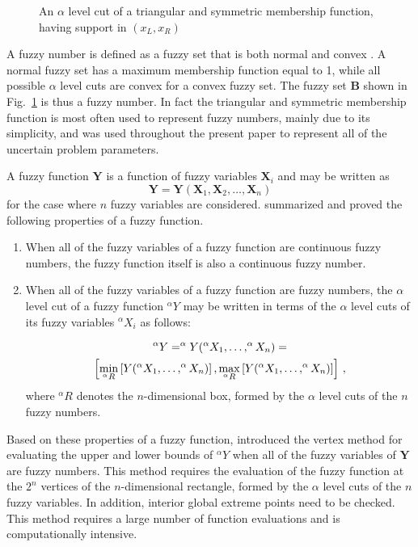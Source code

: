 \documentclass[stropt]{svjour}
\def\b{\mathbf{B}}%
\def\y{\mathbf{Y}}%
\def\x{\mathbf{X}}%
\begin{document}
\begin{figure}
\vspace{5cm}
\caption{An $\alpha$ level cut of a triangular and symmetric membership
function, having support in $(x_L, x_R)$}
\label{fig:1}
\end{figure}

A fuzzy number is defined as a fuzzy set that is both normal and convex
\citep[pp.~97]{Klir95}.
A normal fuzzy set has a maximum membership function equal to 1, while all
possible $\alpha$ level cuts are convex for a convex fuzzy set.
The fuzzy set $\b$
shown in Fig.~\ref{fig:1} is thus a fuzzy number.
In fact the triangular and symmetric membership function is most often used to
represent fuzzy numbers, mainly due to its simplicity, and was used throughout
the present paper to represent all of the uncertain problem parameters.

A fuzzy function $\y$ is a function of fuzzy variables $\x_i$ and may be
written as
\begin{equation}
\y=\y (\x_1,\x_2,\ldots,\x_n) \label{eq03}
\end{equation}
for the case where $n$ fuzzy variables are considered.
\citet[pp.~105--109]{Klir95} summarized and proved the
following properties of a fuzzy function.

\begin{enumerate}
\item When all of the fuzzy variables of a fuzzy function are continuous
fuzzy numbers, the fuzzy function itself is also a continuous fuzzy number.
\item When all of the fuzzy variables of a fuzzy function are fuzzy numbers,
the $\alpha$ level cut of a fuzzy function $^{\alpha}Y$ may be written in
terms of the $\alpha$ level cuts of its fuzzy variables $^{\alpha}X_i$ as
follows:

\begin{gather}
^{\alpha}Y=^{\alpha}Y(^{\alpha}X_1,%
\ldots,^{\alpha}X_n)=\label{eq04}\\
\left[
\min_{^{\alpha}R}
\left[
Y(^{\alpha}X_1,%
\ldots,^{\alpha}X_n)
\right],
\max_{^{\alpha}R}
\left[
Y(^{\alpha}X_1,%
\ldots,^{\alpha}X_n)
\right]
\right]\, ,\notag
\end{gather}
where $^{\alpha}R$ denotes the $n$-dimensional box, formed by the $\alpha$
level cuts of the $n$ fuzzy numbers.
\end{enumerate}
Based on these properties of a fuzzy function,
\cite{Dong87}
introduced the vertex method for evaluating the upper and lower bounds of
$^{\alpha}Y$ when all of the fuzzy variables of $\y$ are fuzzy numbers.
This method requires the evaluation of the fuzzy function at the $2^n$
vertices of the $n$-dimensional rectangle, formed by the $\alpha$ level cuts
of the $n$ fuzzy variables.
In addition, interior global extreme points need to be checked.
This method requires a large number of function evaluations and is
computationally intensive.
\end{document}

